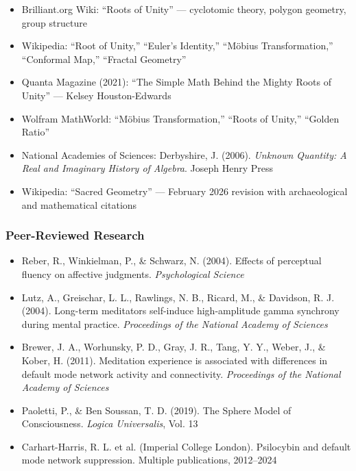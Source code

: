\documentclass[11pt,letterpaper]{article}
\begin{document}
\begin{itemize}[leftmargin=1.5em, itemsep=0.2em]
  \item Brilliant.org Wiki: ``Roots of Unity'' --- cyclotomic theory, polygon geometry, group structure
  \item Wikipedia: ``Root of Unity,'' ``Euler's Identity,'' ``M\"{o}bius Transformation,'' ``Conformal Map,'' ``Fractal Geometry''
  \item Quanta Magazine (2021): ``The Simple Math Behind the Mighty Roots of Unity'' --- Kelsey Houston-Edwards
  \item Wolfram MathWorld: ``M\"{o}bius Transformation,'' ``Roots of Unity,'' ``Golden Ratio''
  \item National Academies of Sciences: Derbyshire, J. (2006). \textit{Unknown Quantity: A Real and Imaginary History of Algebra}. Joseph Henry Press
  \item Wikipedia: ``Sacred Geometry'' --- February 2026 revision with archaeological and mathematical citations
\end{itemize}

\subsubsection{Peer-Reviewed Research}

\begin{itemize}[leftmargin=1.5em, itemsep=0.2em]
  \item Reber, R., Winkielman, P., \& Schwarz, N. (2004). Effects of perceptual fluency on affective judgments. \textit{Psychological Science}
  \item Lutz, A., Greischar, L. L., Rawlings, N. B., Ricard, M., \& Davidson, R. J. (2004). Long-term meditators self-induce high-amplitude gamma synchrony during mental practice. \textit{Proceedings of the National Academy of Sciences}
  \item Brewer, J. A., Worhunsky, P. D., Gray, J. R., Tang, Y. Y., Weber, J., \& Kober, H. (2011). Meditation experience is associated with differences in default mode network activity and connectivity. \textit{Proceedings of the National Academy of Sciences}
  \item Paoletti, P., \& Ben Soussan, T. D. (2019). The Sphere Model of Consciousness. \textit{Logica Universalis}, Vol. 13
  \item Carhart-Harris, R. L. et al. (Imperial College London). Psilocybin and default mode network suppression. Multiple publications, 2012--2024
\end{itemize}
\end{document}
